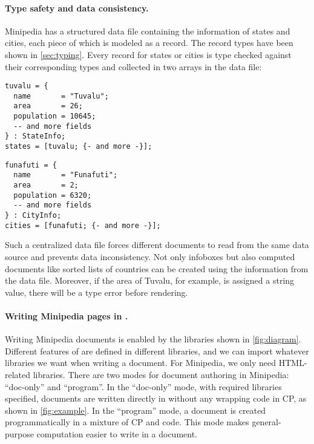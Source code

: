\paragraph{Type safety and data consistency.}
Minipedia has a structured data file containing the information of states and
cities, each piece of which is modeled as a record. The record types have been
shown in \autoref{sec:typing}. Every record for states or cities is type checked
against their corresponding types and collected in two arrays in the data file:

\noindent
\begin{minipage}{0.5\textwidth}
\begin{lstlisting}
tuvalu = {
  name       = "Tuvalu";
  area       = 26;
  population = 10645;
  -- and more fields
} : StateInfo;
states = [tuvalu; {- and more -}];
\end{lstlisting}
\end{minipage}%
\begin{minipage}{0.5\textwidth}
\begin{lstlisting}
funafuti = {
  name       = "Funafuti";
  area       = 2;
  population = 6320;
  -- and more fields
} : CityInfo;
cities = [funafuti; {- and more -}];
\end{lstlisting}
\end{minipage}
\smallskip

\noindent Such a centralized data file forces different documents to read from
the same data source and prevents data inconsistency. Not only infoboxes but
also computed documents like sorted lists of countries can be created using the
information from the data file. Moreover, if the area of Tuvalu, for example, is
assigned a string value, there will be a type error before rendering.

\paragraph{Writing Minipedia pages in \ExT.}
Writing Minipedia documents is enabled by the \ExT libraries shown in
\autoref{fig:diagram}. Different features of \ExT are defined in different
libraries, and we can import whatever libraries we want when writing a document.
For Minipedia, we only need HTML-related libraries. There are two modes for
document authoring in Minipedia: ``doc-only'' and ``program''. In the
``doc-only'' mode, with required libraries specified, documents are written
directly in \ExT without any wrapping code in CP, as shown in
\autoref{fig:example}. In the ``program'' mode, a document is created
programmatically in a mixture of CP and \ExT code. This mode makes
general-purpose computation easier to write in a document.

